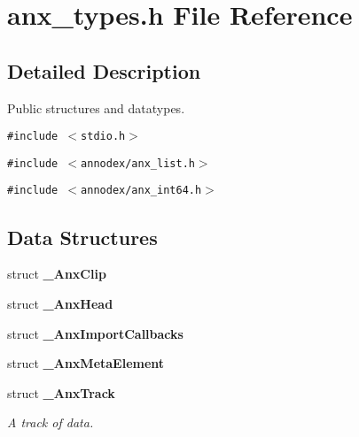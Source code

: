 \section{anx\_\-types.h File Reference}
\label{anx__types_8h}


\subsection{Detailed Description}
Public structures and datatypes. 



{\tt \#include $<$stdio.h$>$}\par
{\tt \#include $<$annodex/anx\_\-list.h$>$}\par
{\tt \#include $<$annodex/anx\_\-int64.h$>$}\par
\subsection*{Data Structures}
\begin{CompactItemize}
\item 
struct {\bf \_\-Anx\-Clip}
\item 
struct {\bf \_\-Anx\-Head}
\item 
struct {\bf \_\-Anx\-Import\-Callbacks}
\item 
struct {\bf \_\-Anx\-Meta\-Element}
\item 
struct {\bf \_\-Anx\-Track}
\begin{CompactList}\small\item\em A track of data. \item\end{CompactList}\end{CompactItemize}
